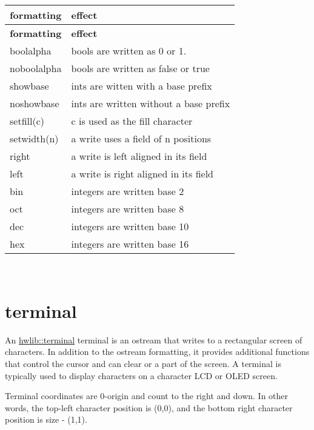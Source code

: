 \tabulinesep=1mm
\begin{longtabu} spread 0pt [c]{*{2}{|X[-1]}|}
\hline
\rowcolor{\tableheadbgcolor}\textbf{ formatting }&\textbf{ effect  }\\
\endfirsthead
\hline
\endfoot
\hline
\rowcolor{\tableheadbgcolor}\textbf{ formatting }&\textbf{ effect  }\\
\endhead
boolalpha &bools are written as \textquotesingle{}0\textquotesingle{} or \textquotesingle{}1\textquotesingle{}. \\
noboolalpha &bools are written as \textquotesingle{}false\textquotesingle{} or \textquotesingle{}true\textquotesingle{} \\
showbase &ints are witten with a base prefix \\
noshowbase &ints are written without a base prefix \\
setfill(c) &c is used as the fill character \\
setwidth(n) &a write uses a field of n positions \\
right &a write is left aligned in its field \\
left &a write is right aligned in its field \\
bin &integers are written base 2 \\
oct &integers are written base 8 \\
dec &integers are written base 10 \\
hex &integers are written base 16 \\
\end{longtabu}
~\newline
 

\hypertarget{char-io_terminal}{}\section{terminal}\label{char-io_terminal}
An \hyperlink{classhwlib_1_1terminal}{hwlib\+::terminal} terminal is an ostream that writes to a rectangular screen of characters. In addition to the ostream formatting, it provides additional functions that control the cursor and can clear or a part of the screen. A terminal is typically used to display characters on a character L\+CD or O\+L\+ED screen.

Terminal coordinates are 0-\/origin and count to the right and down. In other words, the top-\/left character position is (0,0), and the bottom right character position is size -\/ (1,1).

